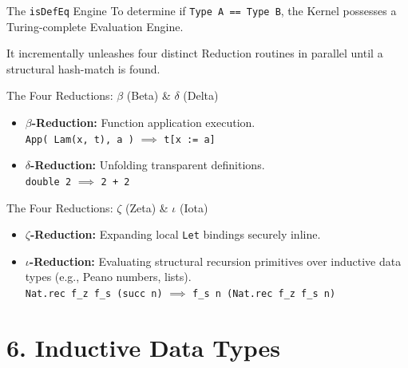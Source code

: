 \documentclass[10pt,aspectratio=169]{beamer}
\begin{document}
\begin{frame}[fragile]{The \texttt{isDefEq} Engine}
    To determine if \verb|Type A == Type B|, the Kernel possesses a Turing-complete Evaluation Engine.
    
    It incrementally unleashes four distinct Reduction routines in parallel until a structural hash-match is found.
\end{frame}

\begin{frame}[fragile]{The Four Reductions: $\beta$ (Beta) \& $\delta$ (Delta)}
    \begin{itemize}
        \item \textbf{$\beta$-Reduction:} Function application execution. 
        \\ \verb|App( Lam(x, t), a )| $\implies$ \verb|t[x := a]|
        
        \vspace{1em}
        \item \textbf{$\delta$-Reduction:} Unfolding transparent definitions.
        \\ \verb|double 2| $\implies$ \verb|2 + 2|
    \end{itemize}
\end{frame}

\begin{frame}[fragile]{The Four Reductions: $\zeta$ (Zeta) \& $\iota$ (Iota)}
    \begin{itemize}
        \item \textbf{$\zeta$-Reduction:} Expanding local \verb|Let| bindings securely inline.
        
        \vspace{1em}
        \item \textbf{$\iota$-Reduction:} Evaluating structural recursion primitives over inductive data types (e.g., Peano numbers, lists).
        \\ \verb|Nat.rec f_z f_s (succ n)| $\implies$ \verb|f_s n (Nat.rec f_z f_s n)|
    \end{itemize}
\end{frame}

\section{6. Inductive Data Types}
\end{document}

